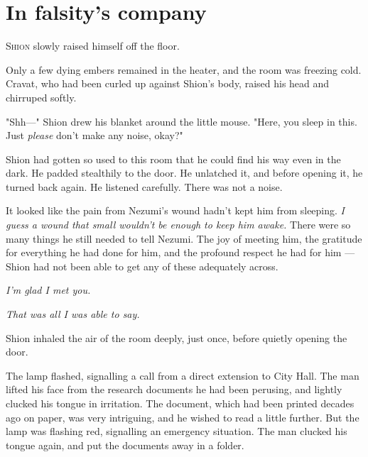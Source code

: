 
\chapter{In falsity's company}


\lettrine{S}{hion} slowly raised himself off the floor.

Only a few dying embers remained in the heater, and the room was
freezing cold. Cravat, who had been curled up against Shion's body,
raised his head and chirruped softly.

"Shh---" Shion drew his blanket around the little mouse. "Here, you sleep
in this. Just \emph{please} don't make any noise, okay?"

Shion had gotten so used to this room that he could find his way even in
the dark. He padded stealthily to the door. He unlatched it, and before
opening it, he turned back again. He listened carefully. There was not a
noise.

It looked like the pain from Nezumi's wound hadn't kept him from
sleeping. \emph{I guess a wound that small wouldn't be enough to keep him
awake.} There were so many things he still needed to tell Nezumi. The joy
of meeting him, the gratitude for everything he had done for him, and
the profound respect he had for him --- Shion had not been able to get any
of these adequately across.

\emph{I'm glad I met you.}

\emph{That was all I was able to say.}

Shion inhaled the air of the room deeply, just once, before quietly
opening the door.

\mybreak

The lamp flashed, signalling a call from a direct extension to City
Hall. The man lifted his face from the research documents he had been
perusing, and lightly clucked his tongue in irritation. The document,
which had been printed decades ago on paper, was very intriguing, and he
wished to read a little further. But the lamp was flashing red,
signalling an emergency situation. The man clucked his tongue again, and
put the documents away in a folder.

